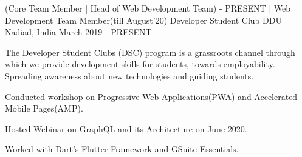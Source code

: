 
\begin{cventries}
  \cventry
    {(Core Team Member | Head of Web Development Team) - PRESENT | Web Development Team Member(till August'20)} %
    {Developer Student Club DDU} %
    {Nadiad, India} %
    {March 2019 - PRESENT} %
    {
      \begin{cvitems} %
        \item {The Developer Student Clubs (DSC) program is a grassroots channel through which we provide development skills for students, towards employability. Spreading awareness about new technologies and guiding students.}
        \item{Conducted workshop on Progressive Web Applications(PWA) and Accelerated Mobile Pages(AMP).}
        \item{Hosted Webinar on GraphQL and its Architecture on June 2020.}
        \item{Worked with Dart's Flutter Framework and GSuite Essentials.}
      \end{cvitems}
    }

    
\end{cventries}
